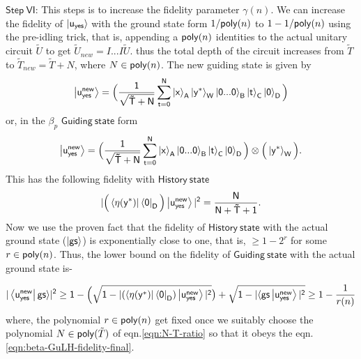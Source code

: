 \documentclass[11pt]{article}
\begin{document}
$\mathsf{Step\ VI}$: This steps is to increase the fidelity parameter $\gamma(n)$. We can increase the fidelity of $\mathsf{\ket{u_{yes}}}$ with the ground state form $1/\mathsf{poly}(n)$ to $1-1/\mathsf{poly}(n)$ using the pre-idling trick, that is, appending a $\mathsf{poly}(n)$ identities to the actual unitary circuit $\tilde{U}$ to get $\tilde{U}_{new}= I...I\tilde{U}$. thus the total depth of the circuit increases from $\tilde{T}$ to $\tilde{T}_{new}=\tilde{T}+N$, where $N \in \mathsf{poly}(n)$. The new guiding state is given by 
\begin{equation}
    \mathsf{\ket{u_{yes}^{new}} = \Big(\frac{1}{\sqrt{\tilde{T}+N}} \sum_{t=0}^{N}\ket{x}_A \ket{y^*}_W \ket{0...0}_B\ket{t}_C\ket{0}_D\Big) }
\end{equation}
or, in the $\beta_p$ $\mathsf{Guiding\ state}$ form
\begin{equation}
    \mathsf{\ket{u_{yes}^{new}} = \Big(\frac{1}{\sqrt{\tilde{T}+N}} \sum_{t=0}^{N}\ket{x}_A\ket{0...0}_B\ket{t}_C\ket{0}_D\Big)\otimes \Big(\ket{y^*}_W \Big) }.
\end{equation}
This has the following fidelity with $\mathsf{History\ state}$  
\begin{equation}\label{eqn:N-T-ratio}
    \mathsf{|\Big(\bra{\eta(y^*)}\bra{0}_D\Big)\ket{u_{yes}^{new}}|^2 = \frac{N}{N+\tilde{T}+1}}.
\end{equation}
Now we use the proven fact that the fidelity of $\mathsf{History\ state}$ with the actual ground state ($\mathsf{\ket{gs}}$) is exponentially close to one, that is, $\geq 1-2^r$ for some $r\in \mathsf{poly}(n)$. Thus, the lower bound on the fidelity of $\mathsf{Guiding\ state}$ with the actual ground state is-

\begin{equation}\label{eqn:beta-GuLH-fidelity-final}
    \mathsf{    |\bra{u_{yes}^{new}}{gs}\rangle|^2 \geq 1-\Big(\sqrt{1-|(\bra{\eta(y^*)}\bra{0}_D)\ket{u_{yes}^{new}}|^2} \big) + \sqrt{1-|\langle gs\ket{u_{yes}^{new}}|^2}}\geq 1-\frac{1}{r(n)}
\end{equation}
where, the polynomial $r\in \mathsf{poly}(n)$ get fixed once we suitably choose the polynomial $N\in \mathsf{poly}(\tilde{T})$ of eqn.\ref{eqn:N-T-ratio} so that it obeys the eqn. \ref{eqn:beta-GuLH-fidelity-final}. \newline
\end{document}
